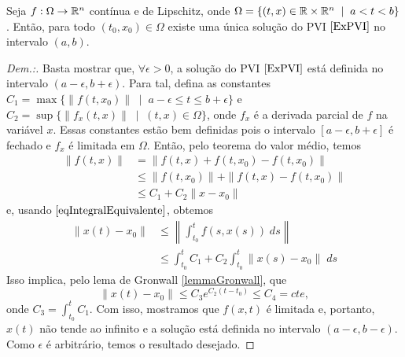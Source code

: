 \begin{theorem}
    \label{teoExistUnic}
    Seja $f:\Omega\to\mathbb{R}^n$ contínua e de Lipschitz, onde $\Omega=\{(t,x)\in\mathbb{R}\times\mathbb{R}^n\;\mid\;  a<t<b\}$. Então, para todo $(t_0,x_0)\in\Omega$ existe uma única solução do PVI $\eqref{ExPVI}$ no intervalo $(a,b)$.
\end{theorem}
\begin{proof}[Dem.:]
    Basta mostrar que, $\forall\epsilon>0$, a solução do PVI $\eqref{ExPVI}$ está definida no intervalo $(a-\epsilon,b+\epsilon)$. Para tal, defina as constantes $C_1=\max\{\|f(t,x_0)\|\;\mid\; a-\epsilon\leq t\leq b+\epsilon\}$ e $C_2=\sup\{\|f_x(t,x)\|\;\mid\; (t,x)\in\Omega\}$, onde $f_x$ é a derivada parcial de $f$ na variável $x$. Essas constantes estão bem definidas pois o intervalo $[a-\epsilon,b+\epsilon]$ é fechado e $f_x$ é limitada em $\Omega$. Então, pelo teorema do valor médio, temos
    \begin{equation}
    \begin{split}
        \|f(t,x)\| &= \|f(t,x)+f(t,x_0)-f(t,x_0)\| \\ &\leq \|f(t,x_0)\| + \|f(t,x)-f(t,x_0)\| \\ & \leq C_1 + C_2\|x-x_0\|
    \end{split}
    \end{equation}
    e, usando $\eqref{eqIntegralEquivalente}$, obtemos
    \begin{equation}
    \begin{split}
        \|x(t)-x_0\| &\leq \left\|\int_{t_0}^t f(s,x(s))\; ds \right\| \\
        & \leq \int_{t_0}^t C_1 + C_2\int_{t_0}^t\|x(s)-x_0\|\; ds
    \end{split}
    \end{equation}
    Isso implica, pelo lema de Gronwall \ref{lemmaGronwall}, que
    \begin{equation}
         \|x(t)-x_0\|\leq C_3 e^{C_2(t-t_0)} \leq C_4=cte,
    \end{equation}
    onde $C_3=\int_{t_0}^t C_1$. Com isso, mostramos que $f(x,t)$ é limitada e, portanto, $x(t)$ não tende ao infinito e a solução está definida no intervalo $(a-\epsilon,b-\epsilon)$. Como $\epsilon$ é arbitrário, temos o resultado desejado.
\end{proof}
